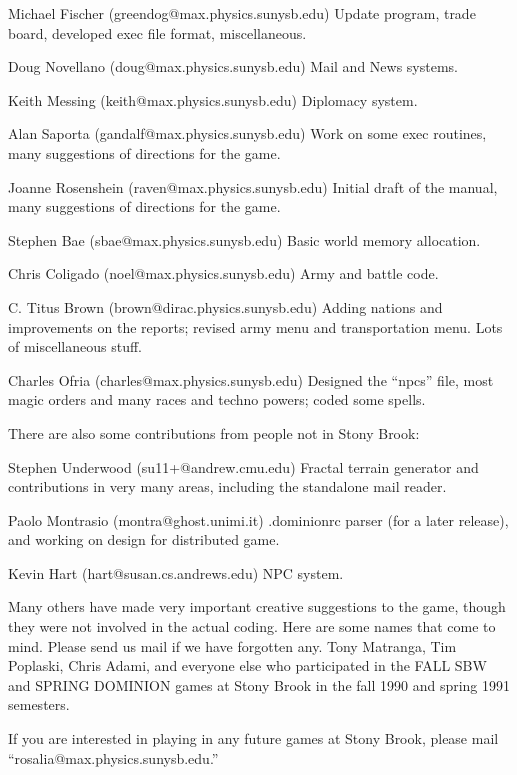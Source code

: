 Michael Fischer (greendog@max.physics.sunysb.edu) Update program, trade
board, developed exec file format, miscellaneous.

Doug Novellano (doug@max.physics.sunysb.edu) Mail and News systems.

Keith Messing (keith@max.physics.sunysb.edu) Diplomacy system.

Alan Saporta (gandalf@max.physics.sunysb.edu) Work on some exec routines,
many suggestions of directions for the game.

Joanne Rosenshein (raven@max.physics.sunysb.edu) Initial draft of the
manual, many suggestions of directions for the game.

Stephen Bae (sbae@max.physics.sunysb.edu) Basic world memory allocation.

Chris Coligado (noel@max.physics.sunysb.edu) Army and battle code.

C. Titus Brown (brown@dirac.physics.sunysb.edu) Adding nations and
improvements on the reports; revised army menu and transportation
menu.  Lots of miscellaneous stuff.

Charles Ofria (charles@max.physics.sunysb.edu) Designed the ``npcs''
file, most magic orders and many races and techno powers; coded some
spells.

There are also some contributions from people not in Stony Brook:

Stephen Underwood (su11+@andrew.cmu.edu) Fractal terrain generator and
contributions in very many areas, including the standalone mail
reader.

Paolo Montrasio (montra@ghost.unimi.it) .dominionrc parser (for
a later release), and working on design for distributed game.

Kevin Hart (hart@susan.cs.andrews.edu) NPC system.

Many others have made very important creative suggestions to the game,
though they were not involved in the actual coding.  Here are some
names that come to mind.  Please send us mail if we have forgotten
any.  Tony Matranga, Tim Poplaski, Chris Adami, and everyone else who
participated in the FALL SBW and SPRING DOMINION games at Stony Brook
in the fall 1990 and spring 1991 semesters.

If you are interested in playing in any future games at Stony Brook,
please mail ``rosalia@max.physics.sunysb.edu.''


